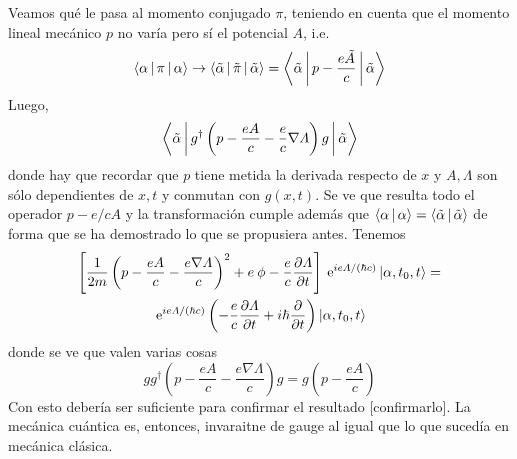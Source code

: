\documentclass[10pt,oneside]{CBFT_book}
\begin{document}
Veamos qué le pasa al momento conjugado $\pi$, teniendo en cuenta que el momento lineal mecánico $p$ no varía
pero sí el potencial $A$, i.e.
\[
	\Braket{\alpha|\pi|\alpha} \to  \Braket{\tilde{\alpha}|\tilde{\pi}|\tilde{\alpha}} =
	\Braket{\tilde{\alpha}| p - \frac{e\tilde{A}}{c} |\tilde{\alpha}}
\]
Luego,
\[
	\Braket{\tilde{\alpha}| g^\dagger \left( p - \frac{e {A}}{c} - \frac{e}{c} \nabla\Lambda \right) g |\tilde{\alpha}}
\]
donde hay que recordar que $p$ tiene metida la derivada respecto de $x$ y $A, \Lambda$ son sólo dependientes
de $x,t$ y conmutan con $g(x,t)$. Se ve que resulta todo el operador $p - e/c A$ y la transformación cumple
además que $\Braket{\alpha|\alpha} =  \Braket{\tilde{\alpha}|\tilde{\alpha}} $ de forma que se ha demostrado lo que se
propusiera antes.
Tenemos
\begin{multline}
	\left[ \frac{1}{2m}\left( p - \frac{e {A}}{c} - \frac{e \nabla\Lambda}{c} \right)^2 +
	e \: \phi - \frac{e}{c} \frac{\partial^{\hspace{-0.05em}} {\Lambda}}{\partial {t}^{\hspace{-0.05em}}} \right] 
	\:\mathrm{e}^{i e \Lambda/ (\hbar c)} \Ket{\alpha,t_0,t} = \\
	\:\mathrm{e}^{i e \Lambda/ (\hbar c)} 
	\left( - \frac{e}{c} \frac{\partial^{\hspace{-0.05em}} {\Lambda}}{\partial {t}^{\hspace{-0.05em}}} + i \hbar \frac{\partial^{\hspace{-0.05em}} {}}{\partial {t}^{\hspace{-0.05em}}} \right) \Ket{\alpha,t_0,t}
\end{multline}
donde se ve que valen varias cosas
\[
	g g^\dagger \left( p - \frac{e {A}}{c} - \frac{e \nabla\Lambda}{c} \right) g = 
	g \left( p - \frac{e {A}}{c}  \right)
\]
Con esto debería ser suficiente para confirmar el resultado [confirmarlo].
La mecánica cuántica es, entonces, invaraitne de gauge al igual que lo que sucedía en mecánica clásica.
\end{document}
